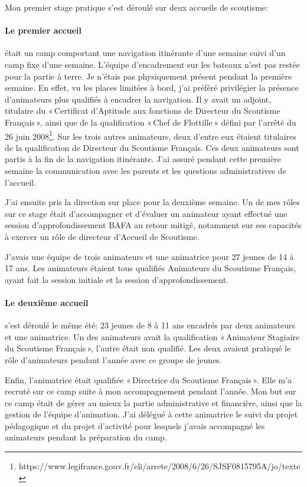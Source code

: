 \documentclass[titlepage,11pt,a4paper]{article}
\begin{document}
Mon premier stage pratique s'est déroulé sur deux accueils de scoutisme:

\paragraph{Le premier accueil} était un camp comportant une navigation itinérante d'une semaine suivi d'un
camp fixe d'une semaine. L'équipe d'encadrement sur les bateaux n'est pas restée pour la
partie à terre. Je n'étais pas physiquement présent pendant la première semaine. En effet,
vu les places limitées à bord, j'ai préféré privilégier la présence d'animateurs plus
qualifiés à encadrer la navigation. Il y avait un adjoint, titulaire du «\,Certificat d’Aptitude aux fonctions de Directeur
du Scoutisme Français\,», ainsi que de la qualification «\,Chef de Flottille\,» défini par
l'arrêté du 26 juin
2008\footnote{https://www.legifrance.gouv.fr/eli/arrete/2008/6/26/SJSF0815795A/jo/texte}.
Sur les trois autres animateurs, deux d'entre eux étaient titulaires de la qualification
de Directeur du Scoutisme Français. Ces deux animateurs sont partis à la fin de
la navigation itinérante.
J'ai assuré pendant cette première semaine la communication avec les parents et les questions administratives de
l'accueil.

J'ai ensuite pris la direction sur place pour la deuxième semaine. Un de mes rôles sur ce
stage était d'accompagner et d'évaluer un animateur ayant effectué une session
d'approfondissement BAFA au retour mitigé, notamment sur ses capacités à exercer un rôle
de directeur d’Accueil de Scoutisme.

J'avais une équipe de trois animateurs et une animatrice pour 27 jeunes de 14 à 17 ans. Les animateurs
étaient tous qualifiés Animateurs du Scoutisme Français, ayant fait la session initiale et
la session d'approfondissement.

\paragraph{Le deuxième accueil} s'est déroulé le même été: 23 jeunes de 8 à 11 ans
encadrés par deux animateurs et une animatrice. Un des animateurs avait la qualification
«\,Animateur Stagiaire du Scoutisme Français\,», l'autre était non qualifié. Les deux
avaient pratiqué le rôle d'animateurs pendant l'année avec ce groupe de jeunes.

Enfin, l'animatrice était qualifiée «\,Directrice du Scoutisme Français\,». Elle m'a
recruté sur ce camp suite à mon accompagnement pendant l'année. Mon but sur ce camp était
de gérer au mieux la partie administrative et financière, ainsi que la gestion de l'équipe
d'animation. J'ai délégué à cette animatrice le suivi du projet pédagogique et du projet
d'activité pour lesquels j'avais accompagné les animateurs pendant la
préparation du camp.
\end{document}
